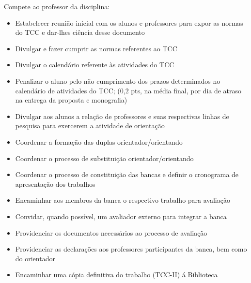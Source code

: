 Compete ao professor da disciplina:

	\begin{itemize}
		\item Estabelecer reuni\~{a}o inicial com os alunos e professores para expor as normas do TCC e dar-lhes ci\^{e}ncia desse documento

		\item Divulgar e fazer cumprir as normas referentes ao TCC
		
		\item Divulgar o calend\'{a}rio referente \`{a}s atividades do TCC

		\item Penalizar o aluno pelo n\~{a}o cumprimento dos prazos determinados no calend\'{a}rio de atividades do TCC; (0,2 pts, na m\'{e}dia final, por dia de atraso na entrega 		da proposta e monografia)
		
		\item Divulgar aos alunos a rela\c{c}\~{a}o de professores e suas respectivas linhas de pesquisa para exercerem a atividade de orienta\c{c}\~{a}o
		
		\item Coordenar a forma\c{c}\~{a}o das duplas orientador/orientando

		\item Coordenar o processo de substitui\c{c}\~{a}o orientador/orientando
		
		\item Coordenar o processo de constitui\c{c}\~{a}o das bancas e definir o cronograma de apresenta\c{c}\~{a}o dos trabalhos
		
		\item Encaminhar aos membros da banca o respectivo trabalho para avalia\c{c}\~{a}o
		
		\item Convidar, quando poss\'{i}vel, um avaliador externo para integrar a banca
		
		\item Providenciar os documentos necess\'{a}rios ao processo de avalia\c{c}\~{a}o

		\item Providenciar as declara\c{c}\~{o}es aos professores participantes da banca, bem como do orientador
		
		\item Encaminhar uma c\'{o}pia definitiva do trabalho (TCC-II) \'{a} Biblioteca
		
	\end{itemize}


